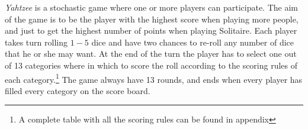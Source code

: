 \emph{Yahtzee} is a stochastic game where one or more players can participate. 
The aim of the game is to be the player with the highest score when playing more people, and just to get the highest number of points when playing Solitaire.
Each player takes turn rolling $1-5$ dice and have two chances to re-roll any number of dice that he or she may want. At the end of the turn the player has to select one out of 13 categories where in which to score the roll according to the scoring rules of each category.\footnote{A complete table with all the scoring rules can be found in appendix %
}
The game always have 13 rounds, and ends when every player has filled every category on the score board.
